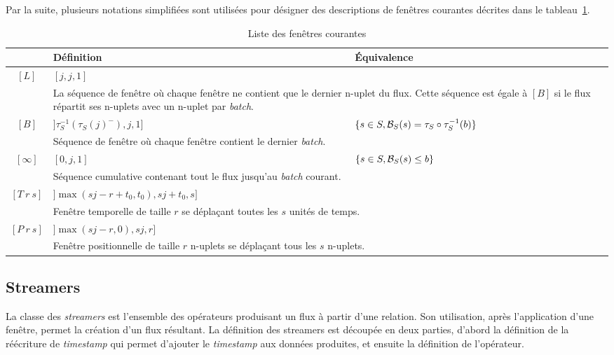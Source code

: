Par la suite, plusieurs notations simplifiées sont utilisées pour désigner des descriptions de fenêtres courantes décrites dans le tableau~\ref{tab:windows}.
\begin{table}[ht]
\centering
\begin{tabular}{c||p{}|p{}}
  & Définition & Équivalence \\ \bottomrule
 $[L]$ & $[j,j,1]$ &  \\ 
 & \multicolumn{2}{p{0.8\textwidth}}{La séquence de fenêtre où chaque fenêtre ne contient que le dernier n-uplet du flux. Cette séquence est égale à $[B]$ si le flux répartit ses n-uplets avec un n-uplet par \textit{batch}.} \\ \hline
 $[B]$ & $]\tau_S^{-1}(\tau_S(j)^-),j,1]$ & $\{s\in S, \mathcal{B}_S(s) = \tau_S\circ\tau_S^{-1}(b)\}$ \\ 
 & \multicolumn{2}{p{0.8\textwidth}}{Séquence de fenêtre où chaque fenêtre contient le dernier \textit{batch}.} \\\hline
 $[\infty]$ & $[0,j,1]$ & $\{s\in S, \mathcal{B}_S(s) \leq b\}$ \\
 & \multicolumn{2}{p{0.8\textwidth}}{Séquence cumulative contenant tout le flux jusqu'au \textit{batch} courant.} \\\hline
 $[T\ r\ s]$ & $]\max(sj-r+t_0,t_0),sj+t_0,s]$ &  \\
 & \multicolumn{2}{p{0.8\textwidth}}{Fenêtre temporelle de taille $r$ se déplaçant toutes les $s$ unités de temps.} \\\hline
 $[P\ r\ s]$ & $]\max(sj-r,0),sj,r]$ &  \\
 & \multicolumn{2}{p{0.8\textwidth}}{Fenêtre positionnelle de taille $r$ n-uplets se déplaçant tous les $s$ n-uplets.} \\
 \toprule
\end{tabular}
\caption{Liste des fenêtres courantes} \label{tab:windows}
\end{table}

\subsection{Streamers}
La classe des \textit{streamers} est l'ensemble des opérateurs produisant un flux à partir d'une relation. Son utilisation, après l'application d'une fenêtre, permet la création d'un flux résultant. La définition des streamers est découpée en deux parties, d'abord la définition de la réécriture de \textit{timestamp} qui permet d'ajouter le \textit{timestamp} aux données produites, et ensuite la définition de l'opérateur.
